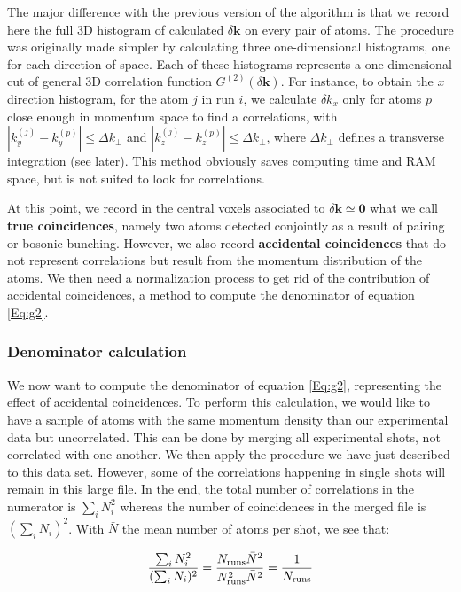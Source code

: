 The major difference with the previous version of the algorithm is that we record here the full 3D histogram of calculated $\delta \bm{k}$ on every pair of atoms. The procedure was originally made simpler by calculating three one-dimensional histograms, one for each direction of space. Each of these histograms represents a one-dimensional cut of general 3D correlation function $G^{(2)}(\delta \bm{k})$. For instance, to obtain the $x$ direction histogram, for the atom $j$ in run $i$, we calculate $\delta k_x$ only for atoms $p$ close enough in momentum space to find a \kk correlations, \ie with $|k_y^{(j)}-k_y^{(p)}| \leq \Delta k_{\perp}$ and $|k_z^{(j)}-k_z^{(p)}| \leq \Delta k_{\perp}$, where $\Delta k_{\perp}$ defines a transverse integration (see later). This method obviously saves computing time and RAM space, but is not suited to look for \kmk correlations.

At this point, we record in the central voxels associated to $\delta \bm{k} \simeq \bm{0}$ what we call \textbf{true coincidences}, namely two atoms detected conjointly as a result of \kmk pairing or bosonic bunching. However, we also record \textbf{accidental coincidences} that do not represent correlations but result from the momentum distribution of the atoms. We then need a normalization process to get rid of the contribution of accidental coincidences, \ie a method to compute the denominator of equation \ref{Eq:g2}.

\subsubsection{Denominator calculation}

\label{sec:algo}

We now want to compute the denominator of equation \ref{Eq:g2}, representing the effect of accidental coincidences. To perform this calculation, we would like to have a sample of atoms with the same momentum density than our experimental data but uncorrelated. This can be done by merging all experimental shots, not correlated with one another. We then apply the procedure we have just described to this data set. However, some of the correlations happening in single shots will remain in this large file. In the end, the total number of correlations in the numerator is $\sum_i N_i^2$ whereas the number of coincidences in the merged file is $(\sum_i N_i)^2$. With $\bar{N}$ the mean number of atoms per shot, we see that:

\begin{equation}
      \frac{\sum_i N_i^2}{(\sum_i N_i)^2}=\frac{N_{\rm{runs}} \bar{N}^2}{N_{\rm{runs}}^2 \bar{N}^2}=\frac{1}{N_{\rm{runs}}}
\end{equation}{}

